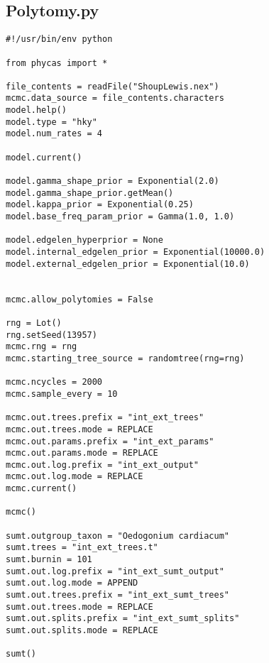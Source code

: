 \documentclass{article}
\begin{document}
\subsection{Polytomy.py}\label{Polytomy}
\begin{verbatim}
#!/usr/bin/env python

from phycas import *

file_contents = readFile("ShoupLewis.nex")
mcmc.data_source = file_contents.characters
model.help()
model.type = "hky"
model.num_rates = 4

model.current()

model.gamma_shape_prior = Exponential(2.0)
model.gamma_shape_prior.getMean()
model.kappa_prior = Exponential(0.25)
model.base_freq_param_prior = Gamma(1.0, 1.0)

model.edgelen_hyperprior = None
model.internal_edgelen_prior = Exponential(10000.0)
model.external_edgelen_prior = Exponential(10.0)


mcmc.allow_polytomies = False

rng = Lot()
rng.setSeed(13957)
mcmc.rng = rng
mcmc.starting_tree_source = randomtree(rng=rng)

mcmc.ncycles = 2000
mcmc.sample_every = 10

mcmc.out.trees.prefix = "int_ext_trees" 
mcmc.out.trees.mode = REPLACE 
mcmc.out.params.prefix = "int_ext_params" 
mcmc.out.params.mode = REPLACE 
mcmc.out.log.prefix = "int_ext_output" 
mcmc.out.log.mode = REPLACE 
mcmc.current()

mcmc()

sumt.outgroup_taxon = "Oedogonium cardiacum" 
sumt.trees = "int_ext_trees.t" 
sumt.burnin = 101 
sumt.out.log.prefix = "int_ext_sumt_output" 
sumt.out.log.mode = APPEND 
sumt.out.trees.prefix = "int_ext_sumt_trees" 
sumt.out.trees.mode = REPLACE 
sumt.out.splits.prefix = "int_ext_sumt_splits" 
sumt.out.splits.mode = REPLACE 

sumt()

\end{verbatim}


\newpage

\end{document}
